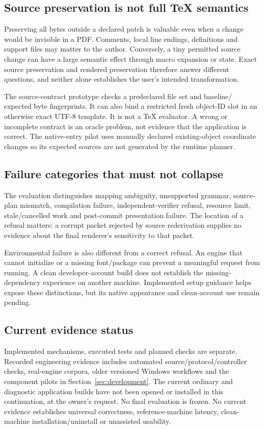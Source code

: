 \subsection{Source preservation is not full TeX semantics}
Preserving all bytes outside a declared patch is valuable even when a change
would be invisible in a PDF. Comments, local line endings, definitions and
support files may matter to the author. Conversely, a tiny permitted source
change can have a large semantic effect through macro expansion or state.
Exact source preservation and rendered preservation therefore answer different
questions, and neither alone establishes the user's intended transformation.

The source-contract prototype checks a predeclared file set and baseline/
expected byte fingerprints. It can also bind a restricted fresh object-ID
slot in an otherwise exact UTF-8 template. It is not a TeX evaluator. A wrong
or incomplete contract is an oracle problem, not evidence that the application
is correct. The native-entry pilot uses manually declared existing-object
coordinate changes so its expected sources are not generated by the runtime
planner.

\subsection{Failure categories that must not collapse}
The evaluation distinguishes mapping ambiguity, unsupported grammar, source-plan
mismatch, compilation failure, independent-verifier refusal, resource limit,
stale/cancelled work and post-commit presentation failure. The location of a
refusal matters: a corrupt packet rejected by source rederivation supplies no
evidence about the final renderer's sensitivity to that packet.

Environmental failure is also different from a correct refusal. An engine
that cannot initialize or a missing font/package can prevent a meaningful
request from running. A clean developer-account build does not establish the
missing-dependency experience on another machine. Implemented setup guidance
helps expose these distinctions, but its native appearance and clean-account
use remain pending.

\subsection{Current evidence status}
Implemented mechanisms, executed tests and planned checks are separate.
Recorded engineering evidence includes automated source/protocol/controller
checks, real-engine corpora, older versioned Windows workflows and the component
pilots in Section~\ref{sec:development}. The current ordinary and diagnostic
application builds have not been opened or installed in this continuation,
at the owner's request. No final evaluation is frozen. No current evidence
establishes universal correctness, reference-machine latency, clean-machine
installation/uninstall or unassisted usability.
